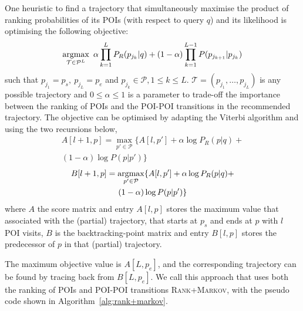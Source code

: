 One heuristic to find a trajectory that simultaneously maximise the product of ranking probabilities
of its POIs (with respect to query $q$) and its likelihood is optimising the following objective:
\begin{equation*}
    \operatorname*{argmax}_{\mathcal{T} \in \mathcal{P}^L} ~\alpha \prod_{k=1}^{L} P_R(p_{j_k} | q) +
                                     (1-\alpha) \prod_{k=1}^{L-1} P(p_{j_{k+1}} | p_{j_k})
\end{equation*}
such that
$p_{j_1} = p_s, ~ p_{j_L} = p_e$ and
$p_{j_k} \in \mathcal{P}, 1 \le k \le L$.
$\mathcal{T} = (p_{j_1}, \dots, p_{j_L})$ is any possible trajectory and
$0 \le \alpha \le 1$ is a parameter to trade-off the importance between the ranking of POIs
and the POI-POI transitions in the recommended trajectory.
The objective can be optimised by adapting the Viterbi algorithm and using the two recursions below,
\begin{multline}
    \label{eq:max}
    A[l+1, p] = \max_{p' \in \mathcal{P}} \{ A[l, p'] + \alpha \log P_R(p|q) + \\ (1-\alpha) \log P(p|p') \}
\end{multline}
\begin{multline}
    \label{eq:argmax}
    B[l+1, p] = \operatorname*{argmax}_{p' \in \mathcal{P}} \{ A[l, p'] + \alpha \log P_R(p|q) + \\ (1-\alpha) \log P(p|p') \}
\end{multline}
where $A$ the score matrix and entry $A[l, p]$ stores the maximum value that associated with the (partial) trajectory, 
that starts at $p_s$ and ends at $p$ with $l$ POI visits,
$B$ is the backtracking-point matrix and entry $B[l, p]$ stores the predecessor of $p$ in that (partial) trajectory.

The maximum objective value is $A[L, p_e]$,
and the corresponding trajectory can be found by tracing back from $B[L, p_e]$.
We call this approach that uses both the ranking of POIs and POI-POI transitions \textsc{Rank+Markov},
with the pseudo code shown in Algorithm~\ref{alg:rank+markov}.

